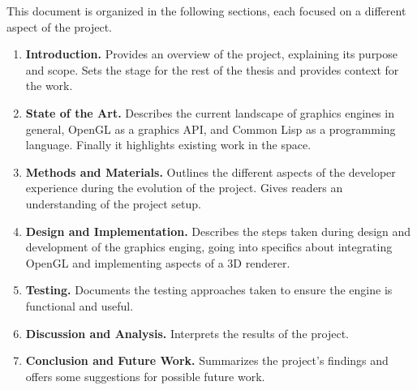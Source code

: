 This document is organized in the following sections, each focused on a different aspect of the project.

\begin{enumerate}
  \item \textbf{Introduction.} Provides an overview of the project, explaining its purpose and scope. Sets the stage for the rest of the thesis and provides context for the work.
  \item \textbf{State of the Art.} Describes the current landscape of graphics engines in general, OpenGL as a graphics API, and Common Lisp as a programming language. Finally it highlights existing work in the space.
  \item \textbf{Methods and Materials.} Outlines the different aspects of the developer experience during the evolution of the project. Gives readers an understanding of the project setup.
  \item \textbf{Design and Implementation.} Describes the steps taken during design and development of the graphics enging, going into specifics about integrating OpenGL and implementing aspects of a 3D renderer.
  \item \textbf{Testing.} Documents the testing approaches taken to ensure the engine is functional and useful.
  \item \textbf{Discussion and Analysis.} Interprets the results of the project.
  \item \textbf{Conclusion and Future Work.} Summarizes the project's findings and offers some suggestions for possible future work.
\end{enumerate}
